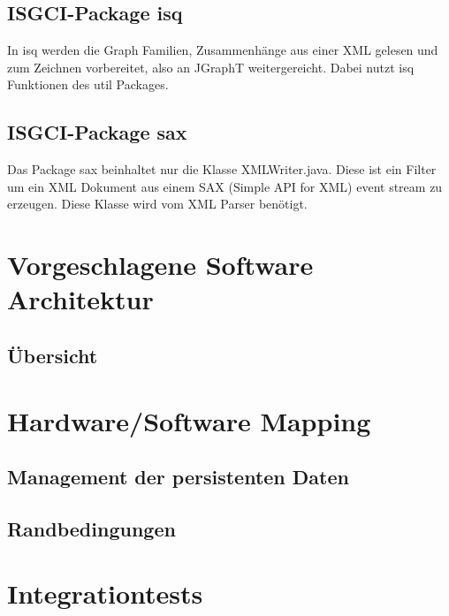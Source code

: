 \documentclass[10pt,a4paper]{article}
\begin{document}
\subsection{ISGCI-Package isq}
In isq werden die Graph Familien, Zusammenhänge aus einer XML gelesen und zum Zeichnen vorbereitet, also an JGraphT weitergereicht. Dabei nutzt isq Funktionen des util Packages. 

\subsection{ISGCI-Package sax}
Das Package sax beinhaltet nur die Klasse XMLWriter.java. Diese ist ein Filter um ein XML Dokument aus einem SAX (Simple API for XML) event stream zu erzeugen. Diese Klasse wird vom XML Parser benötigt.



\section{Vorgeschlagene Software Architektur}
\subsection{Übersicht}
\section{Hardware/Software Mapping}
\subsection{Management der persistenten Daten}
\subsection{Randbedingungen}


\section{Integrationtests}
\end{document}
